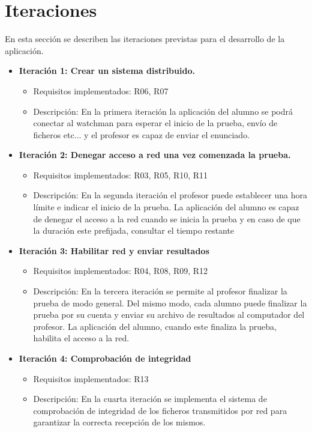 \section{Iteraciones}
\label{sec:planificacion:iteraciones}

En esta sección se describen las iteraciones previstas para el desarrollo de la aplicación.

\begin{itemize}
    \item {\bfseries Iteración 1: Crear un sistema distribuido\cite{distribuidos:2006}.}
    \begin{itemize}
        \item Requisitos implementados: R06, R07
        \item Descripción: En la primera iteración la aplicación del alumno se podrá conectar al watchman para esperar el inicio de la prueba, envío de ficheros etc... y el profesor es capaz de enviar el enunciado.
    \end{itemize}

    \item {\bfseries Iteración 2: Denegar acceso a red una vez comenzada la prueba.}
    \begin{itemize}
        \item Requisitos implementados: R03, R05, R10, R11
        \item Descripción: En la segunda iteración el profesor puede establecer una hora límite e indicar el inicio de la prueba. La aplicación del alumno es capaz de denegar el acceso a la red cuando se inicia la prueba y en caso de que la duración este prefijada, consultar el tiempo restante
    \end{itemize}


    \item {\bfseries Iteración 3: Habilitar red y enviar resultados}
    \begin{itemize}
        \item Requisitos implementados: R04, R08, R09, R12
        \item Descripción: En la tercera iteración se permite al profesor finalizar la prueba de modo general. Del mismo modo, cada alumno puede finalizar la prueba por su cuenta y enviar su archivo de resultados al computador del profesor. La aplicación del alumno, cuando este finaliza la prueba, habilita el acceso a la red.
    \end{itemize}


    \item {\bfseries Iteración 4: Comprobación de integridad}
    \begin{itemize}
        \item Requisitos implementados: R13
        \item Descripción: En la cuarta iteración se implementa el sistema de comprobación de integridad de los ficheros transmitidos por red para garantizar la correcta recepción de los mismos.
    \end{itemize}


\end{itemize}

